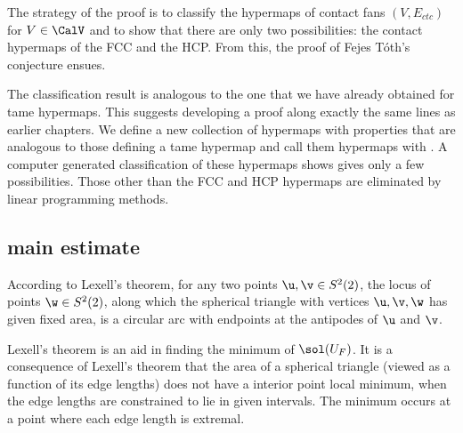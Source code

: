 The strategy of the proof is to classify the hypermaps of contact
fans $(V,E_{ctc})$ for $V\in \CalV$ and to show that there are only two
possibilities: the contact hypermaps of the FCC and the HCP.  From
this, the proof of Fejes T\'oth's conjecture ensues.

The classification result is analogous to the one that we have already
obtained for tame hypermaps.  This suggests developing a proof along
exactly the same lines as earlier chapters.  We define a new
collection of hypermaps with properties that are analogous to those
defining a tame hypermap and call them hypermaps with 
.  A computer generated classification of these hypermaps
shows gives only a few possibilities.  Those other than the FCC and
HCP hypermaps are eliminated by linear programming methods.

\subsection{main estimate}




\begin{remark}
According to Lexell's theorem, for any two points $\u,\v\in S^2(2)$,
the locus of points $\w\in S^2(2)$, along which
the spherical triangle with vertices $\u,\v,\w$ has given fixed area, is a circular arc
with endpoints at the antipodes of $\u$ and $\v$.



Lexell's theorem is an aid in finding the minimum of
  $\sol(U_F)$.
  It is a consequence of Lexell's theorem that the area of a spherical
  triangle (viewed as a function of its edge lengths) does not have a
  interior point local minimum, when the edge lengths are
  constrained to lie in given intervals.  The minimum occurs at a
  point where each edge length is extremal.
%
%
\end{remark}

